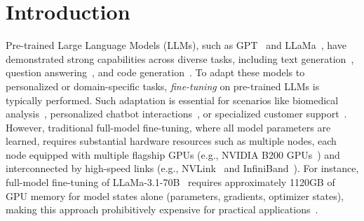 \section{Introduction}
\label{sec:introduction}

Pre-trained Large Language Models (LLMs), such as GPT~\cite{achiam2023gpt} and LLaMa~\cite{llama}, have demonstrated strong capabilities across diverse tasks, including text generation~\cite{brown2020gpt3,zhao2023survey}, question answering~\cite{lewis2020retrieval, guu2020retrieval}, and code generation~\cite{chen2021evaluating-code,nijkamp2022codegen}. 
To adapt these models to personalized or domain-specific tasks, \textit{fine-tuning} on pre-trained LLMs is typically performed.
Such adaptation is essential for scenarios like biomedical analysis~\cite{zhang2024generalist, tian2024opportunities}, personalized chatbot interactions~\cite{wang2022self-instruct}, or specialized customer support~\cite{yun2023fine-tuning-dialogue-summarization}. 
However, traditional full-model fine-tuning, where all model parameters are learned, requires substantial hardware resources such as multiple nodes, each node equipped with multiple flagship GPUs (e.g., NVIDIA B200 GPUs~\cite{B200}) and interconnected by high-speed links (e.g., NVLink~\cite{nvlink} and InfiniBand~\cite{infiniband}).  
For instance, full-model fine-tuning of LLaMa-3.1-70B~\cite{llama3.1} requires approximately 1120GB of GPU memory for model states alone (parameters, gradients, optimizer states), making this approach prohibitively expensive for practical applications~\cite{llama3.1-training-cost}.

